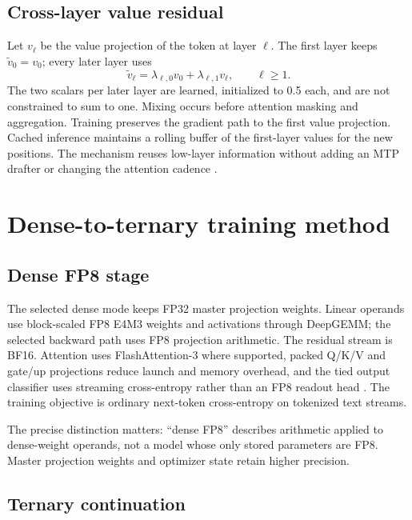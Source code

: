 \documentclass[11pt]{article}
\begin{document}
\subsection{Cross-layer value residual}

Let $v_\ell$ be the value projection of the token at layer $\ell$. The first
layer keeps $\widetilde v_0=v_0$; every later layer uses
\begin{equation}
\widetilde v_\ell=\lambda_{\ell,0}v_0+
\lambda_{\ell,1}v_\ell,\qquad \ell\geq1.
\end{equation}
The two scalars per later layer are learned, initialized to 0.5 each, and
are not constrained to sum to one. Mixing occurs before attention masking
and aggregation. Training preserves the gradient path to the first value
projection. Cached inference maintains a rolling buffer of the first-layer
values for the new positions. The mechanism reuses low-layer information
without adding an MTP drafter or changing the attention cadence
\cite{valueresidual}.

\section{Dense-to-ternary training method}

\subsection{Dense FP8 stage}

The selected dense mode keeps FP32 master projection weights. Linear
operands use block-scaled FP8 E4M3 weights and activations through DeepGEMM;
the selected backward path uses FP8 projection arithmetic. The residual
stream is BF16. Attention uses FlashAttention-3 where supported, packed
Q/K/V and gate/up projections reduce launch and memory overhead, and the
tied output classifier uses streaming cross-entropy rather than an FP8
readout head \cite{fa3,deepgemm}. The training objective is ordinary
next-token cross-entropy on tokenized text streams.

The precise distinction matters: ``dense FP8'' describes arithmetic applied
to dense-weight operands, not a model whose only stored parameters are FP8.
Master projection weights and optimizer state retain higher precision.

\subsection{Ternary continuation}
\end{document}
